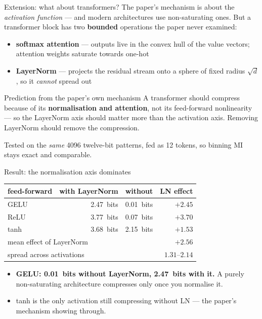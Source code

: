 \documentclass[aspectratio=169,11pt]{beamer}
\begin{document}
\begin{frame}{Extension: what about transformers?}
The paper's mechanism is about the \emph{activation function} --- and modern
architectures use non-saturating ones. But a transformer block has two
\textbf{bounded} operations the paper never examined:
\begin{itemize}
  \item \textbf{softmax attention} --- outputs live in the convex hull of the value
    vectors; attention weights saturate towards one-hot
  \item \textbf{LayerNorm} --- projects the residual stream onto a sphere of fixed
    radius $\sqrt{d}$, so it \emph{cannot} spread out
\end{itemize}
\bigskip
\begin{alertblock}{Prediction from the paper's own mechanism}
A transformer should compress because of its \textbf{normalisation and attention},
not its feed-forward nonlinearity --- so the LayerNorm axis should matter more than
the activation axis. Removing LayerNorm should remove the compression.
\end{alertblock}
\medskip
\footnotesize
Tested on the \emph{same} 4096 twelve-bit patterns, fed as 12 tokens, so binning MI stays exact and comparable.
\end{frame}

\begin{frame}{Result: the normalisation axis dominates}
\centering
\small
\begin{tabular}{lrrr}
\toprule
\textbf{feed-forward} & \textbf{with LayerNorm} & \textbf{without} & \textbf{LN effect} \\
\midrule
GELU & \SI{2.47}{bits} & \SI{0.01}{bits} & $+2.45$ \\
ReLU & \SI{3.77}{bits} & \SI{0.07}{bits} & $+3.70$ \\
tanh & \SI{3.68}{bits} & \SI{2.15}{bits} & $+1.53$ \\
\midrule
\multicolumn{3}{l}{mean effect of LayerNorm} & $\mathbf{+2.56}$ \\
\multicolumn{3}{l}{spread across activations} & $1.31$--$2.14$ \\
\bottomrule
\end{tabular}
\bigskip
\begin{itemize}\small
  \item \textbf{GELU: \SI{0.01}{bits} without LayerNorm, \SI{2.47}{bits} with it.}
    A purely non-saturating architecture compresses only once you normalise it.
  \item tanh is the only activation still compressing without LN --- the paper's
    mechanism showing through.
\end{itemize}
\end{frame}
\end{document}
